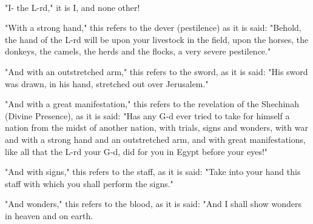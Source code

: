 \documentclass[a4paper,12pt,openany]{memoir}
\newenvironment{HgEnglish}{\strut\\\noindent}{\vspace{1em}}
\begin{document}
\begin{HgEnglish}
"I- the L-rd," it is I, and none other!

"With a strong hand," this refers to the dever (pestilence) as it is said: "Behold, the hand of the L-rd will be upon your livestock in the field, upon the horses, the donkeys, the camels, the herds and the flocks, a very severe pestilence."

"And with an outstretched arm," this refers to the sword, as it is said: "His sword was drawn, in his hand, stretched out over Jerusalem."

"And with a great manifestation," this refers to the revelation of the Shechinah (Divine Presence), as it is said: "Has any G‑d ever tried to take for himself a nation from the midst of another nation, with trials, signs and wonders, with war and with a strong hand and an outstretched arm, and with great manifestations, like all that the L-rd your G‑d, did for you in Egypt before your eyes!"

"And with signs," this refers to the staff, as it is said: "Take into your hand this staff with which you shall perform the signs."

"And wonders," this refers to the blood, as it is said: "And I shall show wonders in heaven and on earth.
\end{HgEnglish}



\end{document}
